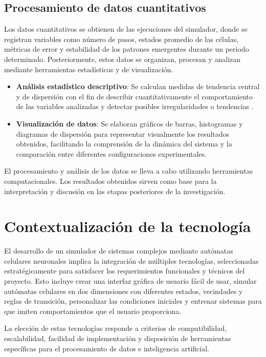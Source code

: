 \subsection{Procesamiento de datos cuantitativos}

Los datos cuantitativos se obtienen de las ejecuciones del simulador, donde se registran variables como número de pasos, estados promedio de las células, métricas de error y estabilidad de los patrones emergentes durante un periodo determinado. Posteriormente, estos datos se organizan, procesan y analizan mediante herramientas estadísticas y de visualización.

\begin{itemize}
	\item \textbf{Análisis estadístico descriptivo}: Se calculan medidas de tendencia central y de dispersión con el fin de describir cuantitativamente el comportamiento de las variables analizadas y detectar posibles irregularidades o tendencias \cite{question2023_estadistico}.
	
	\item \textbf{Visualización de datos}: Se elaboran gráficos de barras, histogramas y diagramas de dispersión para representar visualmente los resultados obtenidos, facilitando la comprensión de la dinámica del sistema y la comparación entre diferentes configuraciones experimentales.
\end{itemize}

El procesamiento y análisis de los datos se lleva a cabo utilizando herramientas computacionales. Los resultados obtenidos sirven como base para la interpretación y discusión en las etapas posteriores de la investigación.

\section{Contextualización de la tecnología}

El desarrollo de un simulador de sistemas complejos mediante autómatas celulares neuronales implica la integración de múltiples tecnologías, seleccionadas estratégicamente para satisfacer los requerimientos funcionales y técnicos del proyecto. Esto incluye crear una interfaz gráfica de usuario fácil de usar, simular autómatas celulares en dos dimensiones con diferentes estados, vecindades y reglas de transición, personalizar las condiciones iniciales y entrenar sistemas para que imiten comportamientos que el usuario proporciona.

La elección de estas tecnologías responde a criterios de compatibilidad, escalabilidad, facilidad de implementación y disposición de herramientas específicas para el procesamiento de datos e inteligencia artificial. 

